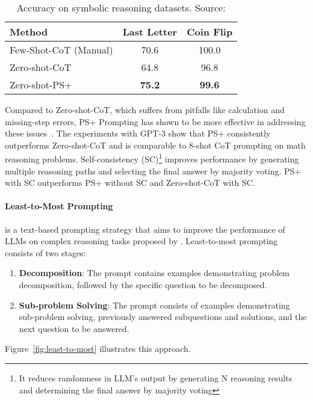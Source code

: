 \begin{table}[h!]
	\centering
	\begin{tabularx}{\textwidth}{Xcc}
		\hline
		\textbf{Method}       & \textbf{Last Letter} & \textbf{Coin Flip} \\ \hline
		Few-Shot-CoT (Manual) & 70.6                 & 100.0              \\
		Zero-shot-CoT         & 64.8                 & 96.8               \\
		Zero-shot-PS+         & \textbf{75.2}        & \textbf{99.6}      \\ \hline
	\end{tabularx}
	\caption{Accuracy on symbolic reasoning datasets. Source: \textcite{wang2023plan}}
	\label{tab:symbolic-reasoning}
\end{table}

Compared to Zero-shot-CoT, which suffers from pitfalls like calculation and missing-step errors, PS+ Prompting has shown to be more effective in addressing these issues~\cite{wang2023plan}.
The experiments with GPT-3 show that PS+ consistently outperforms Zero-shot-CoT and is comparable to 8-shot CoT prompting on math reasoning problems.
Self-consistency (SC)\footnote{It reduces randomness in LLM’s output by generating N reasoning results and determining the final answer by majority voting}\cite{wang2022self} improves performance by generating multiple reasoning paths and selecting the final answer by majority voting.
PS+ with SC outperforms PS+ without SC and Zero-shot-CoT with SC\@.

\paragraph{Least-to-Most Prompting}
\label{par:least-to-most}

is a text-based prompting strategy that aims to improve the performance of LLMs on complex reasoning tasks proposed by \textcite{zhou2022least}.
Least-to-most prompting consists of two stages:
\begin{enumerate}
	\item \textbf{Decomposition}: The prompt contains examples demonstrating problem decomposition, followed by the specific question to be decomposed.
	\item \textbf{Sub-problem Solving}: The prompt consists of examples demonstrating sub-problem solving, previously answered subquestions and solutions, and the next question to be answered.
\end{enumerate}
Figure~\ref{fig:least-to-most} illustrates this approach.

